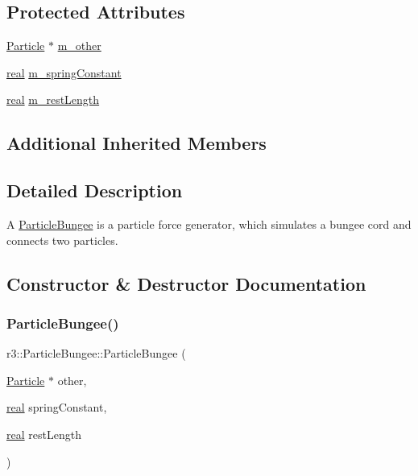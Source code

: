 \subsection*{Protected Attributes}
\begin{DoxyCompactItemize}
\item 
\mbox{\hyperlink{classr3_1_1_particle}{Particle}} $\ast$ \mbox{\hyperlink{classr3_1_1_particle_bungee_ab5c8ec0ee5390b785e02e4dac28f9b5c}{m\+\_\+other}}
\item 
\mbox{\hyperlink{namespacer3_ab2016b3e3f743fb735afce242f0dc1eb}{real}} \mbox{\hyperlink{classr3_1_1_particle_bungee_a5fb1a60d165188d6871ba8b6410c9e84}{m\+\_\+spring\+Constant}}
\item 
\mbox{\hyperlink{namespacer3_ab2016b3e3f743fb735afce242f0dc1eb}{real}} \mbox{\hyperlink{classr3_1_1_particle_bungee_aeefefba54d7f8080424c17d12cb9ca06}{m\+\_\+rest\+Length}}
\end{DoxyCompactItemize}
\subsection*{Additional Inherited Members}


\subsection{Detailed Description}
A \mbox{\hyperlink{classr3_1_1_particle_bungee}{Particle\+Bungee}} is a particle force generator, which simulates a bungee cord and connects two particles. 

\subsection{Constructor \& Destructor Documentation}
\mbox{\label{classr3_1_1_particle_bungee_aab8cdf8541433de21bc3d31db0434b6e}} 
\subsubsection{\texorpdfstring{Particle\+Bungee()}{ParticleBungee()}}
{\footnotesize\ttfamily r3\+::\+Particle\+Bungee\+::\+Particle\+Bungee (\begin{DoxyParamCaption}\item[{\mbox{\hyperlink{classr3_1_1_particle}{Particle}} $\ast$}]{other,  }\item[{\mbox{\hyperlink{namespacer3_ab2016b3e3f743fb735afce242f0dc1eb}{real}}}]{spring\+Constant,  }\item[{\mbox{\hyperlink{namespacer3_ab2016b3e3f743fb735afce242f0dc1eb}{real}}}]{rest\+Length }\end{DoxyParamCaption})\hspace{0.3cm}{\ttfamily [explicit]}}



